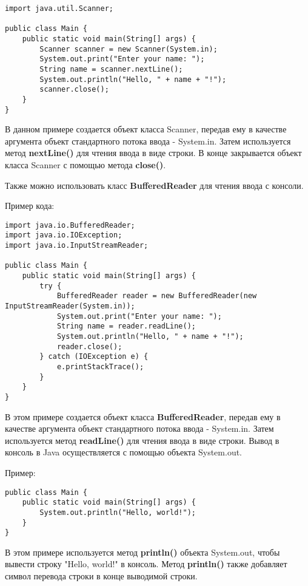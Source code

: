 \documentclass[12pt, a4paper]{book}%
\begin{document}
{\begin{lstlisting}
import java.util.Scanner;

public class Main {
    public static void main(String[] args) {
        Scanner scanner = new Scanner(System.in);
        System.out.print("Enter your name: ");
        String name = scanner.nextLine();
        System.out.println("Hello, " + name + "!");
        scanner.close();
    }
}
\end{lstlisting}

В данном примере создается объект класса Scanner, передав ему в качестве аргумента объект стандартного потока ввода - System.in. Затем используется метод {\bf nextLine()} для чтения ввода в виде строки. В конце закрывается объект класса Scanner с помощью метода {\bf close()}.

Также можно использовать класс {\bf BufferedReader} для чтения ввода с консоли.

Пример кода:

\begin{lstlisting}
import java.io.BufferedReader;
import java.io.IOException;
import java.io.InputStreamReader;

public class Main {
    public static void main(String[] args) {
        try {
            BufferedReader reader = new BufferedReader(new InputStreamReader(System.in));
            System.out.print("Enter your name: ");
            String name = reader.readLine();
            System.out.println("Hello, " + name + "!");
            reader.close();
        } catch (IOException e) {
            e.printStackTrace();
        }
    }
}
\end{lstlisting}

В этом примере создается объект класса {\bf BufferedReader}, передав ему в качестве аргумента объект стандартного потока ввода - System.in. Затем используется метод {\bf readLine()} для чтения ввода в виде строки.
Вывод в консоль в Java осуществляется с помощью объекта System.out.

Пример:

\begin{lstlisting}
public class Main {
    public static void main(String[] args) {
        System.out.println("Hello, world!");
    }
}
\end{lstlisting}

В этом примере используется метод {\bf println()} объекта System.out, чтобы вывести строку "Hello, world!" в консоль. Метод {\bf println()} также добавляет символ перевода строки в конце выводимой строки.

}
\end{document}
